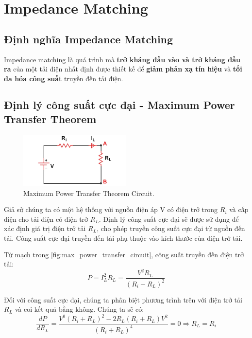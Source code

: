 \chapter{Impedance Matching}
    \section{Định nghĩa Impedance Matching}
        Impedance matching là quá trình mà \textbf{trở kháng đầu vào và trở kháng đầu ra} 
        của một tải điện nhất định được thiết kế để \textbf{giảm phản xạ tín hiệu} và 
        \textbf{tối đa hóa công suất} truyền đến tải điện.\cite{allaboutcircuits_impedance}
    
    \section{Định lý công suất cực đại - Maximum Power Transfer Theorem}
    \label{sec:max_power_transfer_theorem}
        \begin{figure}[h]
            \centering
            \includegraphics[width=0.5\textwidth]{figures/max_power_transfer_circuit.png}
            \caption{Maximum Power Transfer Theorem Circuit.}
            \label{fig:max_power_transfer_circuit}
        \end{figure}

        Giả sử chúng ta có một hệ thống với nguồn điện áp V có điện trở trong $R_i$ và cấp điện cho tải điện có điện trở $R_L$. 
        Định lý công suất cực đại sẽ được sử dụng để xác định giá trị điện trở tải $R_L$, 
        cho phép truyền công suất cực đại từ nguồn đến tải. 
        Công suất cực đại truyền đến tải phụ thuộc vào kích thước của điện trở tải.\par

        Từ mạch trong \autoref{fig:max_power_transfer_circuit}, công suất truyền đến điện trở tải:
        \begin{equation}
            P = I_L^2 R_L = \frac{V^2 R_L}{(R_i + R_L)^2}
        \end{equation}

        Đối với công suất cực đại, chúng ta phân biệt phương trình trên với điện trở tải $R_L$ và coi kết quả bằng không. 
        Chúng ta sẽ có:
        \begin{equation}
            \frac{dP}{dR_L} = \frac{V^2 (R_i + R_L)^2 - 2R_L (R_i + R_L) V^2}{(R_i + R_L)^4} = 0 \Rightarrow R_L = R_i
        \end{equation}

